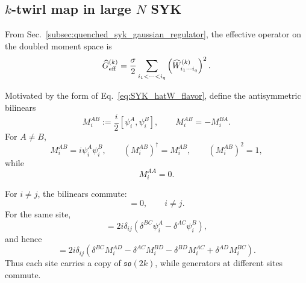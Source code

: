 \documentclass{article}
\theoremstyle{definition}
\begin{document}
\subsection{$k$-twirl map in large $N$ SYK}

From Sec.~\ref{subsec:quenched_syk_gaussian_regulator}, the effective
operator on the doubled moment space is
\begin{equation}
    \widehat G_{\rm eff}^{(k)}
    =
    \frac{\sigma}{2}
    \sum_{i_1<\cdots<i_q}
    \left(
       \widehat W_{i_1\cdots i_q}^{(k)}
    \right)^2.
    \label{eq:SYK_Geff_start}
\end{equation}

Motivated by the form of Eq.~\eqref{eq:SYK_hatW_flavor}, define the
antisymmetric bilinears
\begin{equation}
    M_i^{AB}
    :=
    \frac{i}{2}
    [\psi_i^A,\psi_i^B],
    \qquad
    M_i^{AB}=-M_i^{BA}.
    \label{eq:def_M}
\end{equation}
For $A\neq B$,
\begin{equation}
    M_i^{AB}
    =
    i\psi_i^A\psi_i^B,
    \qquad
    (M_i^{AB})^\dagger=M_i^{AB},
    \qquad
    (M_i^{AB})^2=1,
    \label{eq:M_as_product}
\end{equation}
while
\begin{equation}
    M_i^{AA}=0.
\end{equation}

For $i\neq j$, the bilinears commute:
\begin{equation}
    [M_i^{AB},M_j^{CD}]
    =
    0,
    \qquad
    i\neq j.
    \label{eq:M_commute_different_sites}
\end{equation}
For the same site,
\begin{equation}
    [M_i^{AB},\psi_j^C]
    =
    2i\delta_{ij}
    \left(
       \delta^{BC}\psi_i^A
       -
       \delta^{AC}\psi_i^B
    \right),
    \label{eq:M_comm_psi}
\end{equation}
and hence
\begin{equation}
    [M_i^{AB},M_j^{CD}]
    =
    2i\delta_{ij}
    \left(
       \delta^{BC}M_i^{AD}
       -
       \delta^{AC}M_i^{BD}
       -
       \delta^{BD}M_i^{AC}
       +
       \delta^{AD}M_i^{BC}
    \right).
    \label{eq:so2k_commutator}
\end{equation}
Thus each site carries a copy of $\mathfrak{so}(2k)$, while generators
at different sites commute.
\end{document}

